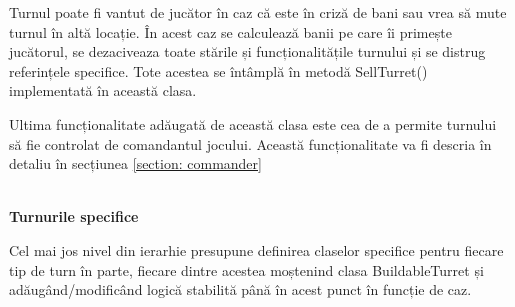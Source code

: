 \documentclass[12pt, a4paper]{article}
\begin{document}
	Turnul poate fi vantut de jucător în caz că este în criză de bani sau vrea să mute turnul în altă locație. În acest caz se calculează banii pe care îi primește jucătorul, se dezaciveaza toate stările și funcționalitățile turnului și se distrug referințele specifice. Tote acestea se întâmplă în metodă SellTurret() implementată în această clasa.
	\newline
	
	Ultima funcționalitate adăugată de această clasa este cea de a permite turnului să fie controlat de comandantul jocului. Această funcționalitate va fi descria în detaliu în secțiunea \ref{section: commander} 
	
	\ \\
	\textbf{Turnurile specifice}
	
	Cel mai jos nivel din ierarhie presupune definirea claselor specifice pentru fiecare tip de turn în parte, fiecare dintre acestea moștenind clasa BuildableTurret și adăugând/modificând logică stabilită până în acest punct în funcție de caz.
	
\end{document}
